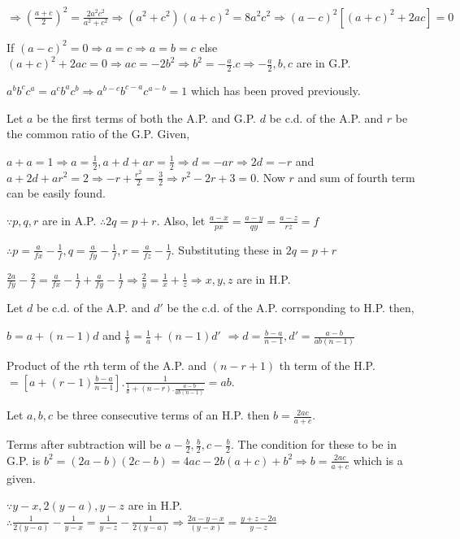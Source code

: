   $\Rightarrow \left(\frac{a + c}{2}\right)^2 = \frac{2a^2c^2}{a^2 + c^2} \Rightarrow (a^2 + c^2)(a + c)^2 =
  8a^2c^2 \Rightarrow (a - c)^2[(a + c)^2 + 2ac] = 0$

  If $(a - c)^2 = 0 \Rightarrow a = c \Rightarrow a = b = c$ else $(a + c)^2 + 2ac = 0 \Rightarrow ac =
  -2b^2 \Rightarrow b^2 = -\frac{a}{2}.c \Rightarrow -\frac{a}{2}, b, c$ are in G.P.
\item  $a^bb^cc^a = a^cb^ac^b  \Rightarrow a^{b - c}b^{c - a}c^{a - b} = 1$ which has been proved
  previously.
\item Let $a$ be the first terms of both the A.P. and G.P. $d$ be c.d. of the A.P. and $r$ be the common
  ratio of the G.P. Given,

  $a + a = 1 \Rightarrow a = \frac{1}{2}, a + d + ar = \frac{1}{2} \Rightarrow d = -ar \Rightarrow 2d = -r$
  and $a + 2d + ar^2 = 2 \Rightarrow -r + \frac{r^2}{2} = \frac{3}{2} \Rightarrow r^2 -2r + 3 = 0$. Now $r$
  and sum of fourth term can be easily found.
\item $\because p, q, r$ are in A.P. $\therefore 2q = p + r$. Also, let $\frac{a - x}{px} = \frac{a - y}{qy}
  = \frac{a - z}{rz} = f$

  $\therefore p = \frac{a}{fx} - \frac{1}{f}, q = \frac{a}{fy} - \frac{1}{f}, r = \frac{a}{fz}-
  \frac{1}{f}$. Substituting these in $2q = p + r$

  $\frac{2a}{fy} - \frac{2}{f} = \frac{a}{fx} - \frac{1}{f} + \frac{a}{fy} - \frac{1}{f} \Rightarrow
  \frac{2}{y} = \frac{1}{x} + \frac{1}{z} \Rightarrow x, y, z$ are in H.P.
\item Let $d$ be c.d. of the A.P. and $d'$ be the c.d. of the A.P. corrsponding to H.P. then,

  $b = a + (n - 1)d$ and $\frac{1}{b} = \frac{1}{a} + (n - 1)d'$ $\Rightarrow d = \frac{b - a}{n - 1}, d' =
  \frac{a - b}{ab(n - 1)}$

  Product of the $r$th term of the A.P. and $(n - r + 1)$ th term of the H.P. $= \left[a + (r -
    1)\frac{b - a}{n - 1}\right].\frac{1}{\frac{1}{a} + (n - r).\frac{a - b}{ab(n - 1)}} = ab$.
\item Let $a, b, c$ be three consecutive terms of an H.P. then $b = \frac{2ac}{a + c}$.

  Terms after subtraction will be $a - \frac{b}{2}, \frac{b}{2}, c - \frac{b}{2}$. The condition for these
  to be in G.P. is $b^2 = (2a - b)(2c - b) = 4ac - 2b(a + c) + b^2 \Rightarrow b = \frac{2ac}{a + c}$ which
  is a given.
\item $\because y - x, 2(y - a), y - z$ are in H.P. $\therefore \frac{1}{2(y - a)} - \frac{1}{y - x} =
  \frac{1}{y - z} - \frac{1}{2(y - a)} \Rightarrow  \frac{2a - y - x}{(y - x)} = \frac{y + z - 2a}{y - z}$

